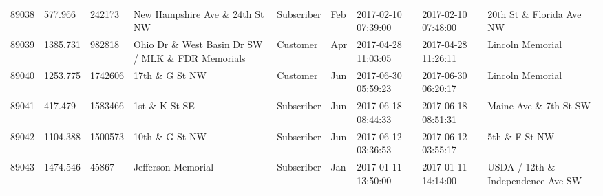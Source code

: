 \documentclass[11pt]{article}
\begin{document}
\begin{tabular}{r|llllllll}
	89038 &  577.966                                           &  242173                                            & New Hampshire Ave \& 24th St NW                   & Subscriber                                         & Feb                                                & 2017-02-10 07:39:00                                & 2017-02-10 07:48:00                                & 20th St \& Florida Ave NW                        \\
	89039 & 1385.731                                             &  982818                                              & Ohio Dr \& West Basin Dr SW / MLK \& FDR Memorials & Customer                                             & Apr                                                  & 2017-04-28 11:03:05                                  & 2017-04-28 11:26:11                                  & Lincoln Memorial                                    \\
	89040 & 1253.775                                           & 1742606                                            & 17th \& G St NW                                   & Customer                                           & Jun                                                & 2017-06-30 05:59:23                                & 2017-06-30 06:20:17                                & Lincoln Memorial                                  \\
	89041 &  417.479                                           & 1583466                                            & 1st \& K St SE                                    & Subscriber                                         & Jun                                                & 2017-06-18 08:44:33                                & 2017-06-18 08:51:31                                & Maine Ave \& 7th St SW                           \\
	89042 & 1104.388                                           & 1500573                                            & 10th \& G St NW                                   & Subscriber                                         & Jun                                                & 2017-06-12 03:36:53                                & 2017-06-12 03:55:17                                & 5th \& F St NW                                   \\
	89043 & 1474.546                                         &   45867                                          & Jefferson Memorial                               & Subscriber                                       & Jan                                              & 2017-01-11 13:50:00                              & 2017-01-11 14:14:00                              & USDA / 12th \& Independence Ave SW             \\

\end{tabular}
\end{document}

